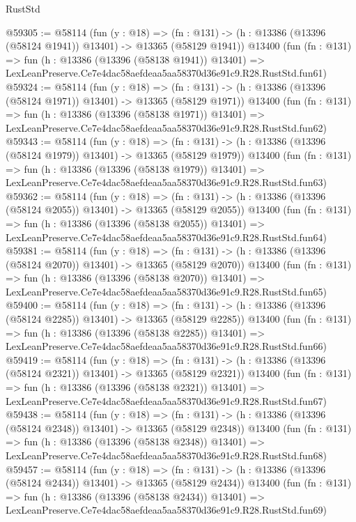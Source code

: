 \begin{lexlean}{RustStd}
\begin{coremodule}
@59305 := @58114
    (fun (y : @18) =>
    (fn : @131) -> (h : @13386 (@13396 (@58124 @1941)) @13401) -> @13365 (@58129 @1941))
    @13400
    (fun (fn : @131) =>
    fun (h : @13386 (@13396 (@58138 @1941)) @13401) =>
    LexLeanPreserve.Ce7e4dac58aefdeaa5aa58370d36e91c9.R28.RustStd.fun61)
@59324 := @58114
    (fun (y : @18) =>
    (fn : @131) -> (h : @13386 (@13396 (@58124 @1971)) @13401) -> @13365 (@58129 @1971))
    @13400
    (fun (fn : @131) =>
    fun (h : @13386 (@13396 (@58138 @1971)) @13401) =>
    LexLeanPreserve.Ce7e4dac58aefdeaa5aa58370d36e91c9.R28.RustStd.fun62)
@59343 := @58114
    (fun (y : @18) =>
    (fn : @131) -> (h : @13386 (@13396 (@58124 @1979)) @13401) -> @13365 (@58129 @1979))
    @13400
    (fun (fn : @131) =>
    fun (h : @13386 (@13396 (@58138 @1979)) @13401) =>
    LexLeanPreserve.Ce7e4dac58aefdeaa5aa58370d36e91c9.R28.RustStd.fun63)
@59362 := @58114
    (fun (y : @18) =>
    (fn : @131) -> (h : @13386 (@13396 (@58124 @2055)) @13401) -> @13365 (@58129 @2055))
    @13400
    (fun (fn : @131) =>
    fun (h : @13386 (@13396 (@58138 @2055)) @13401) =>
    LexLeanPreserve.Ce7e4dac58aefdeaa5aa58370d36e91c9.R28.RustStd.fun64)
@59381 := @58114
    (fun (y : @18) =>
    (fn : @131) -> (h : @13386 (@13396 (@58124 @2070)) @13401) -> @13365 (@58129 @2070))
    @13400
    (fun (fn : @131) =>
    fun (h : @13386 (@13396 (@58138 @2070)) @13401) =>
    LexLeanPreserve.Ce7e4dac58aefdeaa5aa58370d36e91c9.R28.RustStd.fun65)
@59400 := @58114
    (fun (y : @18) =>
    (fn : @131) -> (h : @13386 (@13396 (@58124 @2285)) @13401) -> @13365 (@58129 @2285))
    @13400
    (fun (fn : @131) =>
    fun (h : @13386 (@13396 (@58138 @2285)) @13401) =>
    LexLeanPreserve.Ce7e4dac58aefdeaa5aa58370d36e91c9.R28.RustStd.fun66)
@59419 := @58114
    (fun (y : @18) =>
    (fn : @131) -> (h : @13386 (@13396 (@58124 @2321)) @13401) -> @13365 (@58129 @2321))
    @13400
    (fun (fn : @131) =>
    fun (h : @13386 (@13396 (@58138 @2321)) @13401) =>
    LexLeanPreserve.Ce7e4dac58aefdeaa5aa58370d36e91c9.R28.RustStd.fun67)
@59438 := @58114
    (fun (y : @18) =>
    (fn : @131) -> (h : @13386 (@13396 (@58124 @2348)) @13401) -> @13365 (@58129 @2348))
    @13400
    (fun (fn : @131) =>
    fun (h : @13386 (@13396 (@58138 @2348)) @13401) =>
    LexLeanPreserve.Ce7e4dac58aefdeaa5aa58370d36e91c9.R28.RustStd.fun68)
@59457 := @58114
    (fun (y : @18) =>
    (fn : @131) -> (h : @13386 (@13396 (@58124 @2434)) @13401) -> @13365 (@58129 @2434))
    @13400
    (fun (fn : @131) =>
    fun (h : @13386 (@13396 (@58138 @2434)) @13401) =>
    LexLeanPreserve.Ce7e4dac58aefdeaa5aa58370d36e91c9.R28.RustStd.fun69)

\end{coremodule}
\end{lexlean}
